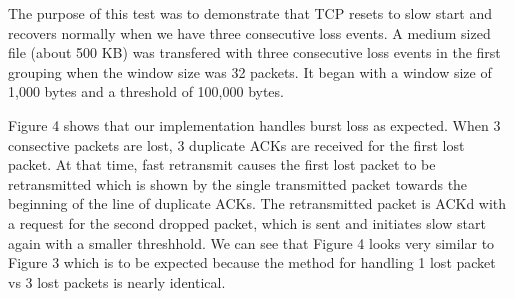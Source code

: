 \documentclass[11pt]{article}
\begin{document}
\begin{enumerate}
The purpose of this test was to demonstrate that TCP resets to slow start and recovers normally when we have three consecutive loss events. A medium sized file (about 500 KB) was transfered with three consecutive loss events in the first grouping when the window size was 32 packets. It began with a window size of 1,000 bytes and a threshold of 100,000 bytes.

Figure 4 shows that our implementation handles burst loss as expected. When 3 consective packets are lost, 3 duplicate ACKs are received for the first lost packet. At that time, fast retransmit causes the first lost packet to be retransmitted which is shown by the single transmitted packet towards the beginning of the line of duplicate ACKs. The retransmitted packet is ACKd with a request for the second dropped packet, which is sent and initiates slow start again with a smaller threshhold. We can see that Figure 4 looks very similar to Figure 3 which is to be expected because the method for handling 1 lost packet vs 3 lost packets is nearly identical.


\end{enumerate}
\end{document}

